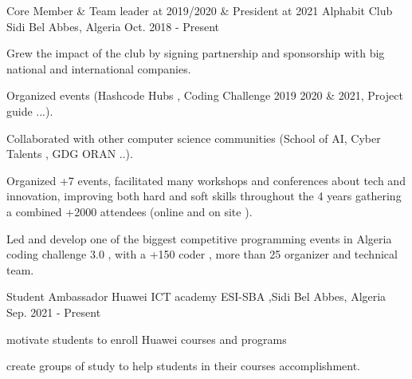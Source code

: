 

\begin{cventries}

  \cventry
    {Core Member \& Team leader at 2019/2020 \& President at 2021} %
    {Alphabit Club} %
    {Sidi Bel Abbes, Algeria} %
    {Oct. 2018 - Present} %
    {
    \begin{cvitems}
      \item {Grew the impact of the club by signing partnership and sponsorship with big national and international companies.}
      \item {Organized events (Hashcode Hubs , Coding Challenge 2019 2020 \& 2021, Project guide ...). }
      \item {Collaborated with other computer science communities (School of    AI, Cyber Talents , GDG ORAN ..).}
       \item {Organized +7 events, facilitated many workshops and conferences    about tech and innovation, improving both hard and soft skills          throughout the 4 years gathering a combined +2000 attendees (online     and on site ).}
      \item {Led and develop one of the biggest competitive programming events   in Algeria coding challenge 3.0 , with a +150 coder , more than 25       organizer and technical team. }
    \end{cvitems}}
  \cventry
    {Student Ambassador} %
    {Huawei ICT academy } %
    {ESI-SBA ,Sidi Bel Abbes, Algeria} %
    {Sep. 2021 - Present} %
    {
      \begin{cvitems} %
        \item {motivate students to enroll Huawei courses and programs}
        \item {create groups of study to help students in their courses accomplishment.}
      \end{cvitems}
    }

\end{cventries}
